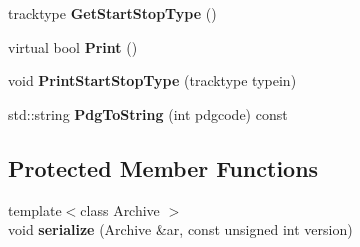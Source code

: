 \begin{DoxyCompactItemize}
\item 
\hypertarget{classParticle_ab404296b0aade0d142ed84346f1f28fe}{
tracktype {\bfseries GetStartStopType} ()}
\label{classParticle_ab404296b0aade0d142ed84346f1f28fe}

\item 
\hypertarget{classParticle_ae7b8186de6a1411be76fb81f7e175a2b}{
virtual bool {\bfseries Print} ()}
\label{classParticle_ae7b8186de6a1411be76fb81f7e175a2b}

\item 
\hypertarget{classParticle_a682e48911a77706d2257a8bd8bb5b024}{
void {\bfseries PrintStartStopType} (tracktype typein)}
\label{classParticle_a682e48911a77706d2257a8bd8bb5b024}

\item 
\hypertarget{classParticle_a702bafa2b8781400e32ffec62fe9831b}{
std::string {\bfseries PdgToString} (int pdgcode) const }
\label{classParticle_a702bafa2b8781400e32ffec62fe9831b}

\end{DoxyCompactItemize}
\subsection*{Protected Member Functions}
\begin{DoxyCompactItemize}
\item 
\hypertarget{classParticle_a9485a9eae1311872ebb21359ef1b3ce3}{
{\footnotesize template$<$class Archive $>$ }\\void {\bfseries serialize} (Archive \&ar, const unsigned int version)}
\label{classParticle_a9485a9eae1311872ebb21359ef1b3ce3}

\end{DoxyCompactItemize}
